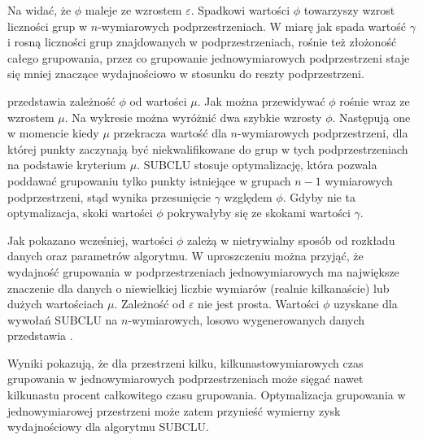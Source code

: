 

Na  widać, że $ \phi $ maleje ze wzrostem $ \varepsilon $. Spadkowi wartości $ \phi $ towarzyszy wzrost liczności grup w $ n $-wymiarowych podprzestrzeniach. W miarę jak spada wartość $ \gamma $ i rosną liczności grup znajdowanych w podprzestrzeniach, rośnie też złożoność całego grupowania, przez co grupowanie jednowymiarowych podprzestrzeni staje się mniej znaczące wydajnościowo w stosunku do reszty podprzestrzeni.\par

 przedstawia zależność $ \phi $ od wartości $ \mu $. Jak można przewidywać $ \phi $ rośnie wraz ze wzrostem $ \mu $. Na wykresie można wyróżnić dwa szybkie wzrosty $ \phi $. Następują one w momencie kiedy $ \mu $ przekracza wartość dla $ n $-wymiarowych podprzestrzeni, dla której punkty zaczynają być niekwalifikowane do grup w tych podprzestrzeniach na podstawie kryterium $ \mu $. SUBCLU stosuje optymalizację, która pozwala poddawać grupowaniu tylko punkty istniejące w grupach $ n-1 $ wymiarowych podprzestrzeni, stąd wynika przesunięcie $ \gamma $ względem $ \phi $. Gdyby nie ta optymalizacja, skoki wartości $ \phi $ pokrywałyby się ze skokami wartości $ \gamma $.

Jak pokazano wcześniej, wartości $ \phi $ zależą w nietrywialny sposób od rozkładu danych oraz parametrów algorytmu. W uproszczeniu można przyjąć, że wydajność grupowania w podprzestrzeniach jednowymiarowych ma największe znaczenie dla danych o niewielkiej liczbie wymiarów (realnie kilkanaście) lub dużych wartościach $ \mu $. Zależność od $ \varepsilon $ nie jest prosta. Wartości $ \phi $ uzyskane dla wywołań SUBCLU na $ n $-wymiarowych, losowo wygenerowanych danych przedstawia .



Wyniki pokazują, że dla przestrzeni kilku, kilkunastowymiarowych czas grupowania w jednowymiarowych podprzestrzeniach może sięgać nawet kilkunastu procent całkowitego czasu grupowania. Optymalizacja grupowania w jednowymiarowej przestrzeni może zatem przynieść wymierny zysk wydajnościowy dla algorytmu SUBCLU. 


